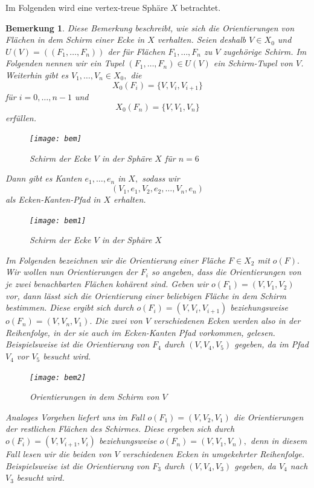 \documentclass[12pt,titlepage,twoside,cleardoublepage]{article}
\theoremstyle{nummermitklammern}
\newtheorem{bemerkung}[temp]{Bemerkung}
\newtheorem{bemerkung}[zahl]{Bemerkung}
\numberwithin{equation}{section}
\begin{document}
Im Folgenden wird eine vertex-treue Sphäre $X$ betrachtet.
\begin{bemerkung}\label{tup}
Diese Bemerkung beschreibt, wie sich die Orientierungen von Flächen in dem Schirm einer Ecke in $X$ verhalten.
 Seien deshalb $V\in X_0$ und $U(V)=((F_1,\ldots,F_n))$ der für Flächen $F_1,\ldots,F_n$ zu $V$ zugehörige Schirm. Im Folgenden nennen wir ein Tupel $(F_1,\ldots,F_n)\in U(V)$ ein \emph{Schirm-Tupel} von $V$. Weiterhin gibt es $V_1,\ldots,V_n\in X_0,$ die 
\[
X_0(F_i)=\{V,V_i,V_{i+1}\}
\] 
für $i=0,\ldots,n-1$ und 
\[
X_0(F_n)=\{V,V_{1},V_{n}\}
\] erfüllen.
\begin{figure}[H]
\begin{center}
\texttt{[image: bem]}
\end{center}
\caption{Schirm der Ecke $V$ in der Sphäre $X$ für $n=6$}
\end{figure}
Dann gibt es Kanten $e_1,\ldots,e_n$ in $X,$ sodass wir 
\[
(V_1,e_1,V_2,e_2,\ldots,V_n,e_n)
\] 
als Ecken-Kanten-Pfad in $X$ erhalten. 
\begin{figure}[H]
\begin{center}
\texttt{[image: bem1]}
\end{center}
\caption{Schirm der Ecke $V$ in der Sphäre $X$}
\end{figure}
Im Folgenden bezeichnen wir die Orientierung einer Fläche $F\in X_2$  mit $o(F).$ Wir wollen nun Orientierungen der $F_i$ so angeben, dass die Orientierungen von je zwei benachbarten Flächen kohärent sind. 
Geben wir $o(F_1)=(V,V_1,V_2)$ vor, dann lässt sich die Orientierung einer beliebigen Fläche in dem Schirm bestimmen. Diese ergibt sich durch $o(F_i)=(V,V_i,V_{i+1})$ beziehungsweise $o(F_n)=(V,V_n,V_1).$ Die zwei von $V$ verschiedenen Ecken werden also in der Reihenfolge, in der sie auch im Ecken-Kanten Pfad vorkommen, gelesen. Beispielsweise ist die Orientierung von $F_4$ durch $(V,V_4,V_5)$ gegeben, da im Pfad $V_4$ vor $V_5 $ besucht wird. 
\begin{figure}[H]
\begin{center}
\texttt{[image: bem2]}
\end{center}
\caption{Orientierungen in dem Schirm von $V$}
\end{figure}
Analoges Vorgehen liefert uns im Fall $o(F_1)=(V,V_2,V_1)$ die Orientierungen der restlichen Flächen des Schirmes. Diese ergeben sich durch $o(F_i)=(V,V_{i+1},V_{i})$ beziehungsweise $o(F_n)=(V,V_1,V_n),$ denn in diesem Fall lesen wir die beiden von $V$ verschiedenen Ecken in umgekehrter Reihenfolge. Beispielsweise ist die Orientierung von $F_3$ durch $(V,V_4,V_3)$ gegeben, da $V_4$ nach $V_3$ besucht wird.

\end{bemerkung}
\end{document}
